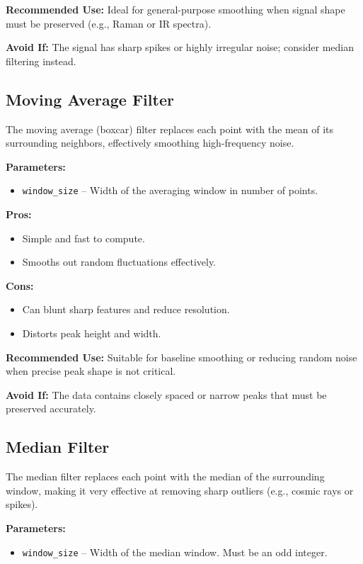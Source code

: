 \textbf{Recommended Use:}  
Ideal for general-purpose smoothing when signal shape must be preserved (e.g., Raman or IR spectra).

\textbf{Avoid If:}  
The signal has sharp spikes or highly irregular noise; consider median filtering instead.

\subsection{Moving Average Filter}

The moving average (boxcar) filter replaces each point with the mean of its surrounding neighbors, effectively smoothing high-frequency noise.

\textbf{Parameters:}
\begin{itemize}
    \item \texttt{window\_size} – Width of the averaging window in number of points.
\end{itemize}

\textbf{Pros:}
\begin{itemize}
    \item Simple and fast to compute.
    \item Smooths out random fluctuations effectively.
\end{itemize}

\textbf{Cons:}
\begin{itemize}
    \item Can blunt sharp features and reduce resolution.
    \item Distorts peak height and width.
\end{itemize}

\textbf{Recommended Use:}  
Suitable for baseline smoothing or reducing random noise when precise peak shape is not critical.

\textbf{Avoid If:}  
The data contains closely spaced or narrow peaks that must be preserved accurately.

\subsection{Median Filter}

The median filter replaces each point with the median of the surrounding window, making it very effective at removing sharp outliers (e.g., cosmic rays or spikes).

\textbf{Parameters:}
\begin{itemize}
    \item \texttt{window\_size} – Width of the median window. Must be an odd integer.
\end{itemize}

